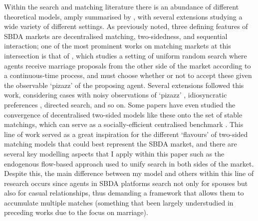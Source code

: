 Within the search and matching literature there is an abundance of different theoretical models, amply summarised by \cite{chade2017sorting}, with several extensions studying a wide variety of different settings. As previously noted, three defining features of SBDA markets are decentralised matching, two-sidedness, and sequential interaction; one of the most prominent works on matching markets at this intersection is that of \cite{burdett1997marriage}, which studies a setting of uniform random search where agents receive marriage proposals from the other side of the market according to a continuous-time process, and must choose whether or not to accept these given the observable `pizazz' of the proposing agent. Several extensions followed this work, considering cases with noisy observations of `pizazz' \citep{chade2006matching}, idiosyncratic preferences \citep{burdett1998two}, directed search, and so on. Some papers have even studied the convergence of decentralised two-sided models like these onto the set of stable matchings, which can serve as a socially-efficient centralised benchmark \citep{adachi2003search}. This line of work served as a great inspiration for the different `flavours' of two-sided matching models that could best represent the SBDA market, and there are several key modelling aspects that I apply within this paper such as the endogenous flow-based approach used to unify search in both sides of the market. Despite this, the main difference between my model and others within this line of research occurs since agents in SBDA platforms search not only for spouses but also for casual relationships, thus demanding a framework that allows them to accumulate multiple matches (something that been largely understudied in preceding works due to the focus on marriage). 

